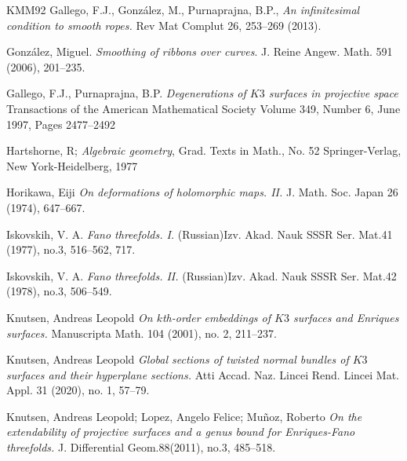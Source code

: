 \documentclass[11pt,twoside]{amsart}
\theoremstyle{plain}
\numberwithin{equation}{section}
\theoremstyle{definition}
\begin{document}
\begin{thebibliography}{KMM92}
Gallego, F.J., González, M., Purnaprajna, B.P., 
\emph{An infinitesimal condition to smooth ropes.}
Rev Mat Complut 26, 253–269 (2013).

  Gonz\'alez, Miguel.
  \emph{Smoothing of ribbons over curves}.
  J. Reine Angew. Math. 591 (2006), 201--235.

Gallego, F.J., Purnaprajna, B.P.
\emph{Degenerations of $K3$ surfaces in projective space}
Transactions of the American Mathematical Society
Volume 349, Number 6, June 1997, Pages 2477–2492



\color{black}


Hartshorne, R; \emph{Algebraic geometry}, 
Grad. Texts in Math., No. 52
Springer-Verlag, New York-Heidelberg, 1977

\color{black}

Horikawa, Eiji
\emph{On deformations of holomorphic maps. II.}
J. Math. Soc. Japan 26 (1974), 647–667.



Iskovskih, V. A.
\emph{Fano threefolds. I.}
(Russian)Izv. Akad. Nauk SSSR Ser. Mat.41 (1977), no.3, 516–562, 717.

Iskovskih, V. A.
\emph{Fano threefolds. II.}
(Russian)Izv. Akad. Nauk SSSR Ser. Mat.42 (1978), no.3, 506–549.



Knutsen, Andreas Leopold
\emph{On $k$th-order embeddings of $K3$ surfaces and Enriques surfaces.}
Manuscripta Math. 104 (2001), no. 2, 211–237.

Knutsen, Andreas Leopold
\emph{Global sections of twisted normal bundles of $K3$ surfaces and their hyperplane sections.}
Atti Accad. Naz. Lincei Rend. Lincei Mat. Appl. 31 (2020), no. 1, 57–79.


Knutsen, Andreas Leopold; Lopez, Angelo Felice; Muñoz, Roberto
\emph{On the extendability of projective surfaces and a genus bound for Enriques-Fano threefolds.}
J. Differential Geom.88(2011), no.3, 485–518.


\end{thebibliography}
\end{document}
